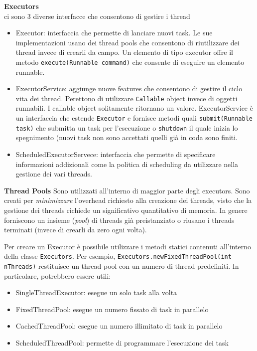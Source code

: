 \documentclass{article}
\begin{document}
\textbf{Executors}\\
ci sono 3 diverse interfacce che consentono di gestire i thread
\begin{itemize}
\item Executor: interfaccia che permette di lanciare nuovi task. Le sue implementazioni usano dei thread pools che consentono di riutilizzare dei thread invece di crearli da campo. Un elemento di tipo executor offre il metodo \texttt{execute(Runnable command)} che consente di eseguire un elemento runnable. 
\item ExecutorService: aggiunge nuove features che consentono di gestire il ciclo vita dei thread. Perettono di utilizzare \texttt{Callable} object invece di oggetti runnabili. I callable object solitamente ritornano un valore. ExecutorService \`e un interfaccia che estende \texttt{Executor} e fornisce metodi quali \texttt{submit(Runnable task)} che submitta un task per l'esecuzione o \texttt{shutdown} il quale inizia lo spegnimento (nuovi task non sono accettati quelli gi\`a in coda sono finiti.
\item ScheduledExecutorServece: interfaccia che permette di specificare informazioni addizionali come la politica di scheduling da utilizzare nella gestione dei vari threads.
\end{itemize}

\textbf{Thread Pools}
Sono utilizzati all'interno di maggior parte degli executors. Sono creati per \emph{minimizzare} l'overhead richiesto alla creazione dei threads, visto che la gestione dei threads richiede un significativo quantitativo di memoria. In genere forniscono un insieme (\emph{pool}) di threads gi\`a preistanziato o riusano i threads terminati (invece di crearli da zero ogni volta).

Per creare un Executor \`e possibile utilizzare i metodi statici contenuti all'interno della classe \texttt{Executors}. Per esempio, \texttt{Executors.newFixedThreadPool(int nThreads)} restituisce un thread pool con un numero di thread predefiniti. In particolare, potrebbero essere utili:
\begin{itemize}
\item SingleThreadExecutor: esegue un solo task alla volta
\item FixedThreadPool: esegue un numero fissato di task in parallelo
\item CachedThreadPool: esegue un numero illimitato di task in parallelo
\item ScheduledThreadPool: permette di programmare l'esecuzione dei task
\end{itemize}
\end{document}
